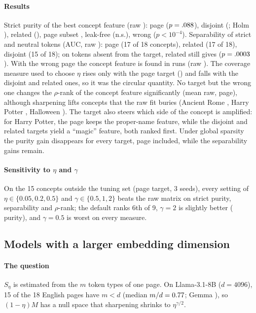\paragraph{Results}
Strict purity of the best concept feature (raw ): page  ($p = .088$), disjoint  (; Holm ), related  (), page subset , leak-free  (n.s.), wrong  ($p < 10^{-4}$).
Separability of strict and neutral tokens (AUC, raw ): page  (17 of 18 concepts), related  (17 of 18), disjoint  (15 of 18); on tokens absent from the target, related still gives  ($p = .0003$).
With the wrong page the concept feature is found in  runs (raw ).
The coverage measure used to choose $\eta$ rises only with the page target () and falls with the disjoint and related ones, so it was the circular quantity.
No target but the wrong one changes the $\rho$-rank of the concept feature significantly (mean  raw,  page), although sharpening lifts concepts that the raw fit buries (Ancient Rome , Harry Potter , Halloween ).
The target also steers which side of the concept is amplified: for Harry Potter, the page keeps the proper-name feature, while the disjoint and related targets yield a ``magic'' feature, both ranked first.
Under global sparsity the purity gain disappears for every target, page included, while the separability gains remain.

\paragraph{Sensitivity to $\eta$ and $\gamma$}
On the 15 concepts outside the tuning set (page target, 3 seeds), every setting of $\eta \in \{0.05, 0.2, 0.5\}$ and $\gamma \in \{0.5, 1, 2\}$ beats the raw matrix on strict purity, separability and $\rho$-rank; the default ranks 6th of 9, $\gamma = 2$ is slightly better ( purity), and $\gamma = 0.5$ is worst on every measure.

\subsection{Models with a larger embedding dimension}
\label{app:cs-llama}

\paragraph{The question}
$S_\eta$ is estimated from the $m$ token types of one page.
On Llama-3.1-8B ($d = 4096$), 15 of the 18 English pages have $m < d$ (median $m/d = 0.77$; Gemma ), so $(1-\eta)M$ has a null space that sharpening shrinks to $\eta^{\gamma/2}$.

